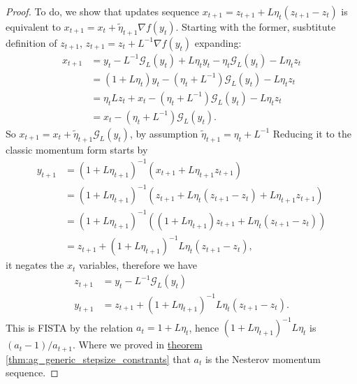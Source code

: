 \documentclass[12pt]{article}
\begin{document}
        \begin{proof}
            To do, we show that updates sequence $x_{t + 1} = z_{t + 1} + L\eta_t (z_{t + 1} - z_t)$ is equivalent to $x_{t + 1} = x_t + \tilde\eta_{t + 1}\nabla f(y_t)$. 
            Starting with the former, susbtitute definition of $z_{t + 1}$, $z_{t + 1} = z_t + L^{-1}\nabla f(y_t)$ expanding: 
            \begin{align*}
                x_{t + 1} &= y_t - L^{-1}\mathcal G_L(y_t) 
                + L \eta_t y_t - \eta_t \mathcal G_L(y_t) - L\eta_t z_t
                \\
                &= 
                (1 + L\eta_t)y_t - (\eta_t + L^{-1})\mathcal G_L(y_t) - L\eta_t z_t
                \\
                &= \eta_t Lz_t + x_t -(\eta_t + L^{-1}) \mathcal G_L(y_t)  - L\eta_t z_t
                \\
                &= x_t - (\eta_t + L^{-1})\mathcal G_L(y_t). 
            \end{align*}
            So $x_{t + 1} = x_t + \tilde \eta_{t + 1}\mathcal G_L(y_t)$, by assumption $\tilde \eta_{t + 1} = \eta_t + L^{-1}$
            Reducing it to the classic momentum form starts by 
            \begin{align*}
                y_{t + 1} &= (1 + L\eta_{t + 1})^{-1} (x_{t + 1} + L\eta_{t + 1}z_{t + 1})
                \\
                &= (1 + L\eta_{t + 1})^{-1} (
                    z_{t + 1} + L\eta_t (z_{t + 1} - z_t) + L\eta_{t + 1} z_{t + 1}
                )
                \\
                &= 
                (1 + L\eta_{t + 1})^{-1} (
                    (1 + L\eta_{t + 1})z_{t + 1} + L\eta_t(z_{t + 1} - z_t)
                )
                \\
                &= z_{t + 1} + (1 + L\eta_{t + 1})^{-1}L\eta_t (z_{t + 1} - z_t), 
            \end{align*}
            it negates the $x_t$ variables, therefore we have 
            \begin{align*}
                z_{t + 1} &= y_t - L^{-1} \mathcal G_L (y_t)
                \\
                y_{t + 1} &= z_{t + 1} + (1 + L\eta_{t + 1})^{-1}L\eta_t (z_{t + 1} - z_t).
            \end{align*}
            This is FISTA by the relation $a_t = 1 + L\eta_t$, hence $(1 + L\eta_{t + 1})^{-1}L\eta_t$ is $(a_t - 1)/a_{t + 1}$.
            Where we proved in 
            \hyperref[thm:ag_generic_stepsize_constrants]
                {theorem \ref*{thm:ag_generic_stepsize_constrants}}
            that $a_t$ is the Nesterov momentum sequence. 
        \end{proof}
\end{document}
